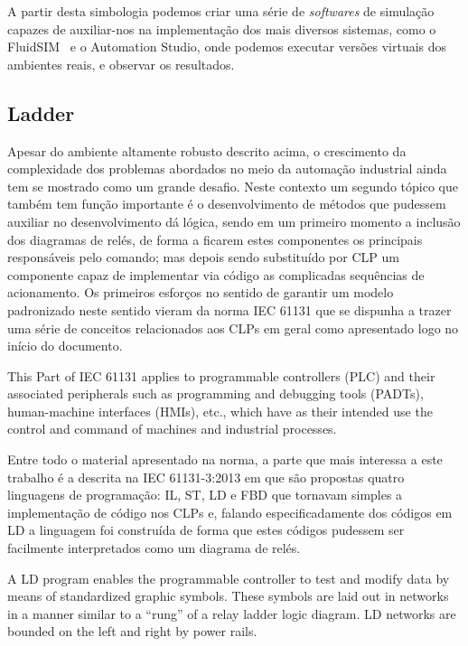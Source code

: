 A partir desta simbologia podemos criar uma série de \textit{softwares} de simulação capazes de auxiliar-nos na 
implementação dos mais diversos sistemas, como o FluidSIM\textregistered~ e o Automation Studio, onde podemos executar
versões virtuais dos ambientes reais, e observar os resultados. 

\subsection{Ladder}

Apesar do ambiente altamente robusto descrito acima, o crescimento da complexidade dos problemas abordados no meio da 
automação industrial ainda tem se mostrado como um grande desafio. Neste contexto um segundo tópico que também tem função 
importante é o desenvolvimento de métodos que pudessem auxiliar no desenvolvimento dá lógica, sendo em um primeiro momento
a inclusão dos diagramas de relés, de forma a ficarem estes componentes os principais responsáveis pelo comando; 
mas depois sendo substituído por \ac{CLP} um componente capaz de implementar via código as complicadas sequências de acionamento.
Os primeiros esforços no sentido de garantir um modelo padronizado neste sentido vieram da norma IEC 61131 que se dispunha
a trazer uma série de conceitos relacionados aos \ac{CLP}s em geral como apresentado logo no início do documento.

\begin{citacao}
    This Part of IEC 61131 applies to programmable controllers (PLC) and their associated 
    peripherals such as programming and debugging tools (PADTs), human-machine interfaces
    (HMIs), etc., which have as their intended use the control and command of machines and
    industrial processes.\cite{IEC-61131-1:2003}
\end{citacao}    

Entre todo o material apresentado na norma, a parte que mais interessa a este trabalho é a descrita na IEC 61131-3:2013 
em que são propostas quatro linguagens de programação: \ac{IL}, \ac{ST}, \ac{LD} e \ac{FBD} \cite{IEC-61131-3:2013} 
que tornavam simples a implementação de código nos \ac{CLP}s e, falando especificadamente dos códigos em \ac{LD} a 
linguagem foi construída de forma que estes códigos pudessem ser facilmente interpretados como um diagrama de relés.

\begin{citacao}
    A LD program enables the programmable controller to test and modify data by means of standardized
    graphic symbols. These symbols are laid out in networks in a manner similar to a “rung” of a relay
    ladder logic diagram. LD networks are bounded on the left and right by power rails.\cite{IEC-61131-3:2013}
\end{citacao}    

